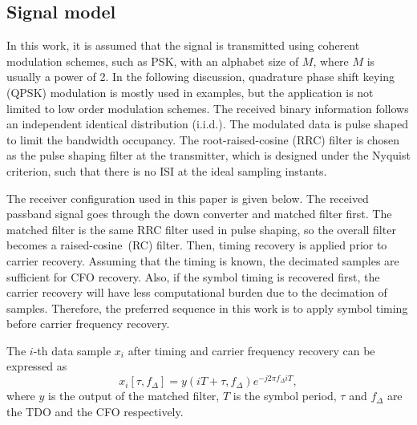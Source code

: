 \documentclass[journal,comsoc]{IEEEtran}
\begin{document}
\subsection{Signal model }  


In this work, it is assumed that the signal is transmitted using coherent modulation schemes, such as PSK, with an alphabet size of \(M\), where \(M\) is usually a power of 2.
In the following discussion, quadrature phase shift keying (QPSK) modulation is mostly used in examples, but the application is not limited to low order modulation schemes.
The received binary information follows an independent identical distribution (i.i.d.).
The modulated data is pulse shaped to limit the bandwidth occupancy.
The root-raised-cosine (RRC) filter is chosen as the pulse shaping filter at the transmitter, which is designed under the Nyquist criterion, 
such that there is no ISI at the ideal sampling instants.


The receiver configuration used in this paper is given below.
The received passband signal goes through the down converter and matched filter first.
The matched filter is the same RRC filter used in pulse shaping, so the overall filter becomes a raised-cosine~(RC) filter. 
Then, timing recovery is applied prior to carrier recovery.
Assuming that the timing is known, the decimated samples are sufficient for CFO recovery.
Also, if the symbol timing is recovered first, the carrier recovery will have less computational burden due to the decimation of samples.
Therefore, the preferred sequence in this work is to apply symbol timing before carrier frequency recovery.

The $i$-th data sample \(x_i\) after timing and carrier frequency recovery can be expressed as \cite{Xie2012ExactOFDM}
\begin{equation}
{x_i}[\tau, f_\Delta ] = y(iT +  \tau, f_\Delta){e^{ - j2\pi {f_\Delta }iT}},
\end{equation}
% 
% 
where \(y\) is the output of the matched filter, \(T\) is the symbol period, \(\tau\) and \(f_\Delta\) are the TDO and the CFO respectively.
\end{document}
